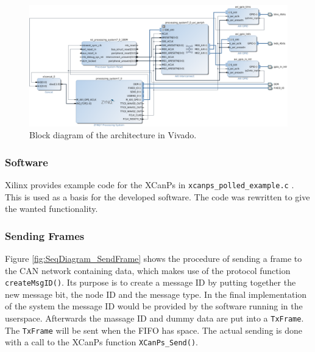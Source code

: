 \begin{figure}[h!]
	\centering
	\includegraphics[width = 1\linewidth]{graphics/Zybo_BasicTestingArchitecture_for_CAN.png}
	\caption{Block diagram of the architecture in Vivado.}
	\label{fig:CAN_Testing_Architecture}
\end{figure}

\subsubsection*{Software}\label{sub:Basic_SourceCode}
Xilinx provides example code for the XCanPs in \texttt{xcanps\_polled\_example.c} \cite{xcanps}.
This is used as a basis for the developed software.
The code was rewritten to give the wanted functionality.

\subsubsection*{Sending Frames}
Figure \ref{fig:SeqDiagram_SendFrame} shows the procedure of sending a frame to the CAN network containing data, which makes use of the protocol function \texttt{createMsgID()}.
Its purpose is to create a message ID by putting together the new message bit, the node ID and the message type.
In the final implementation of the system the message ID would be provided by the software running in the userspace.
Afterwards the massage ID and dummy data are put into a \texttt{TxFrame}.
The \texttt{TxFrame} will be sent when the FIFO has space.
The actual sending is done with a call to the XCanPs function \texttt{XCanPs\_Send()}.

